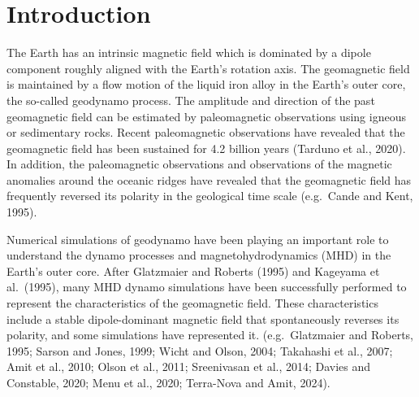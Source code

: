 \newpage
\section{Introduction}
\label{section:introduction}
The Earth has an intrinsic magnetic field which is dominated by a dipole component roughly aligned with the Earth's rotation axis. 
{\color{teal}
The geomagnetic field is maintained by a flow motion of the liquid iron alloy in the Earth's outer core, the so-called geodynamo process.
}
The amplitude and direction of the past geomagnetic field can be estimated by paleomagnetic observations using igneous or sedimentary rocks. Recent paleomagnetic observations have revealed that the geomagnetic field has been sustained for 4.2 billion years (Tarduno et al., 2020). %
In addition, the paleomagnetic observations and observations of the magnetic anomalies around the oceanic ridges have revealed that 
{\color{teal}
the geomagnetic field has frequently reversed its polarity in the geological time scale (e.g.\ Cande and Kent, 1995).
}

Numerical simulations of geodynamo have been playing an important role to understand the dynamo processes and magnetohydrodynamics (MHD) in the Earth's outer core.
After Glatzmaier and Roberts (1995) %
and Kageyama et al.\ (1995), %
many MHD dynamo simulations have been successfully performed to represent the characteristics of the geomagnetic field. 
{\color{magenta}
These characteristics include a stable dipole-dominant magnetic field that spontaneously reverses its polarity, and some simulations have represented it. (e.g.\ Glatzmaier and Roberts, 1995; 
}
Sarson and Jones, 1999;
{\color{teal}
Wicht and Olson, 2004;
}
Takahashi et al., 2007; 
{\color{red}
Amit et al., 2010; 
}
Olson et al., 2011; 
Sreenivasan et al., 2014;
{\color{red}
Davies and Constable, 2020;
Menu et al., 2020;
Terra-Nova and Amit, 2024).
}

